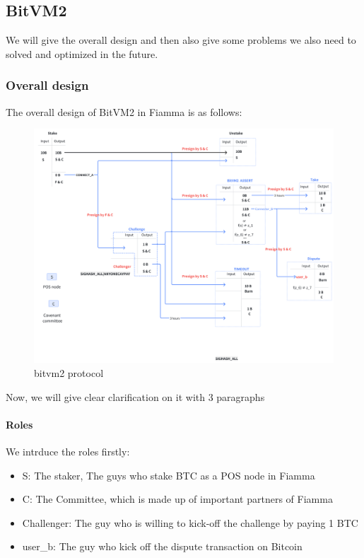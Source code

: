 \subsection{BitVM2}

We will give the overall design and then also give some problems we also need to solved and optimized in the future.

\subsubsection{Overall design}

The overall design of BitVM2 in Fiamma is as follows:

\begin{figure}[ht] 
    \centering  
    \includegraphics[width=0.85\columnwidth]{images/bitvm2 protocol.png} 
    \caption{bitvm2 protocol}
    \label{fig:bitvm2 protocol}
\end{figure}

Now, we will give clear clarification on it with 3 paragraphs

\paragraph{Roles}

We intrduce the roles firstly:

\begin{itemize}
    \item S: The staker, The guys who stake BTC as a POS node in Fiamma
    \item C: The Committee, which is made up of important partners of Fiamma
    \item Challenger: The guy who is willing to kick-off the challenge by paying 1 BTC
    \item user\_b: The guy who kick off the dispute transaction on Bitcoin 
\end{itemize}

